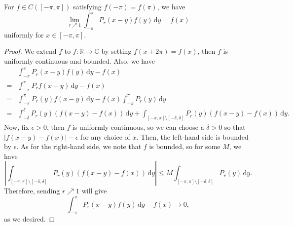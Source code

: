 \begin{lemma}
	For \(f\in C([-\pi , \pi ])\)  satisfying \(f(-\pi) = f(\pi )\), we have
	\[
		\lim\limits_{r \nearrow 1} \int _{-\pi }^\pi P_{r} (x - y)f(y)\,\mathrm{d} y = f(x)
	\]
	uniformly for \(x\in [-\pi , \pi ]\).
\end{lemma}
\begin{proof}
	We extend \(f\) to \(f\colon \mathbb{R} \to \mathbb{C} \) by setting \(f(x + 2\pi ) = f(x)\), then \(f\) is
	uniformly continuous and bounded. Also, we have
	\[
		\begin{split}
			&\int _{-\pi }^\pi P_{r} (x - y)f(y)\,\mathrm{d} y - f(x)\\
			= &\int _{-\pi }^\pi P_{r} f(x-y)\,\mathrm{d} y - f(x)\\
			= &\int _{-\pi }^\pi P_{r} (y) f(x-y) \,\mathrm{d} y - f(x)\int _{-\pi }^\pi P_{r} (y)\,\mathrm{d} y\\
			= &\int _{-\delta }^\delta P_{r} (y)(f(x-y) - f(x))\,\mathrm{d} y + \int _{[-\pi , \pi ]\setminus [-\delta , \delta ]}P_{r} (y)(f(x-y) - f(x))\,\mathrm{d} y.
		\end{split}
	\]
	Now, fix \(\epsilon >0\), then \(f\) is uniformly continuous, so we can choose a \(\delta >0\) so that \(\left\vert f(x-y)-f(x) \right\vert -\epsilon \) for
	any choice of \(x\). Then, the left-hand side is bounded by \(\epsilon \). As for the right-hand side, we note that \(f\) is bounded, so for some \(M\),
	we have
	\[
		\left\vert \int _{[-\pi , \pi ]\setminus [-\delta , \delta ]}P_{r} (y)(f(x-y)-f(x)) \,\mathrm{d} y\right\vert \leq M \int _{[-\pi , \pi ]\setminus [-\delta , \delta ]}P_{r} (y)\,\mathrm{d} y.
	\]
	Therefore, sending \(r \nearrow 1\) will give
	\[
		\int _{-\pi }^\pi P_{r} (x-y)f(y)\,\mathrm{d} y - f(x) \to 0,
	\]
	as we desired.
\end{proof}